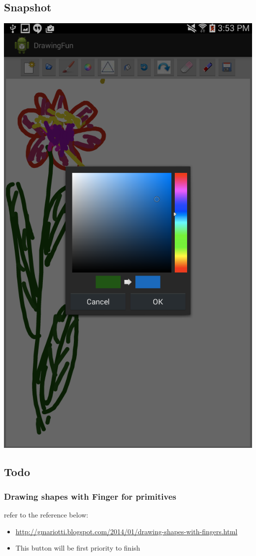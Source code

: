 \documentclass[9pt,b5paper]{article}
\begin{document}
\subsection{Snapshot}
\label{sec-2-3}
\includegraphics[width=.9\linewidth]{./20141103.png}

\subsection{Todo}
\label{sec-2-4}
\subsubsection{Drawing shapes with Finger for primitives}
\label{sec-2-4-1}
refer to the reference below: 
\begin{itemize}
\item \url{http://gmariotti.blogspot.com/2014/01/drawing-shapes-with-fingers.html}
\item This button will be first priority to finish
\end{itemize}
\end{document}
